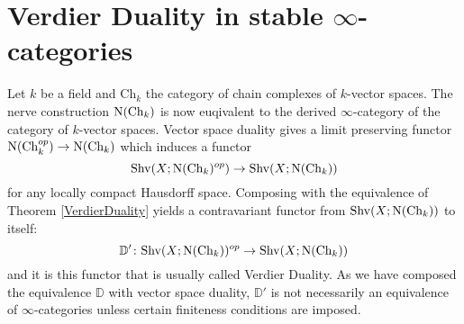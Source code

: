 \documentclass[../../thesis.tex]{subfiles}
\begin{document}
\section{Verdier Duality in stable $\infty$-categories}
Let $k$ be a field and $\mathrm{Ch}_k$ the category of chain complexes of $k$-vector spaces.
The nerve construction $\mathrm{N}(\mathrm{Ch}_k)$ is now euqivalent to the derived $\infty$-category of the category of $k$-vector spaces.
Vector space duality gives a limit preserving functor $\mathrm{N}(\mathrm{Ch}_k^{op}) \to \mathrm{N}(\mathrm{Ch}_k)$ which induces a functor
\[
    \mathrm{Shv}(X;\mathrm{N}(\mathrm{Ch}_k)^{op}) \to \mathrm{Shv}(X;\mathrm{N}(\mathrm{Ch}_k))
\]
for any locally compact Hausdorff space.
Composing with the equivalence of Theorem \ref{VerdierDuality} yields a contravariant functor from $\mathrm{Shv}(X;\mathrm{N}(\mathrm{Ch}_k))$ to itself:
\[
    \mathbb{D}'\colon \mathrm{Shv}(X;\mathrm{N}(\mathrm{Ch}_k))^{op} \to \mathrm{Shv}(X;\mathrm{N}(\mathrm{Ch}_k))
\]
and it is this functor that is usually called Verdier Duality. As we have composed the equivalence $\mathbb{D}$ with vector space duality, $\mathbb{D}'$ is not necessarily an equivalence of $\infty$-categories unless certain finiteness conditions are imposed.
\end{document}
